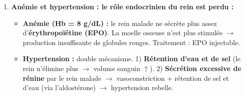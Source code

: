 \documentclass[11pt]{article}
\begin{document}
\begin{exoresolu}
\begin{enumerate}
            \begin{itemize}
                \item Le sang du patient circule dans un \textbf{filtre (dialyseur)} composé de membranes \textbf{semi-perméables}.
                \item De l'autre côté de la membrane circule le \textbf{liquide de dialyse} (eau purifiée, ions à concentration normale, \textbf{sans urée ni créatinine}).
                \item \textbf{Phénomènes physiques :}
                    \begin{itemize}
                        \item \textbf{Diffusion :} l'urée, la créatinine, le K$^+$ en excès passent du sang (très concentré) vers le liquide de dialyse (sans déchets) $\rightarrow$ \textbf{épuration}.
                        \item \textbf{Ultrafiltration :} une pression force le passage de l'eau en excès du sang vers le liquide de dialyse $\rightarrow$ \textbf{retrait de la surcharge en eau}.
                    \end{itemize}
                \item Le sang \textbf{épuré et débarrassé de l'excès d'eau} retourne vers le patient.
            \end{itemize}
        \item \textbf{Anémie et hypertension : le rôle endocrinien du rein est perdu :}
            \begin{itemize}
                \item \textbf{Anémie (Hb = 8 g/dL) :} le rein malade ne sécrète plus assez d'\textbf{érythropoïétine (EPO)}. La moelle osseuse n'est plus stimulée $\rightarrow$ production insuffisante de globules rouges. Traitement : EPO injectable.
                \item \textbf{Hypertension :} double mécanisme. 1) \textbf{Rétention d'eau et de sel} (le rein n'élimine plus $\rightarrow$ volume sanguin $\uparrow$). 2) \textbf{Sécrétion excessive de rénine} par le rein malade $\rightarrow$ vasoconstriction + rétention de sel et d'eau (via l'aldostérone) $\rightarrow$ hypertension rebelle.
            \end{itemize}
    \end{enumerate}
\end{exoresolu}
\end{document}
